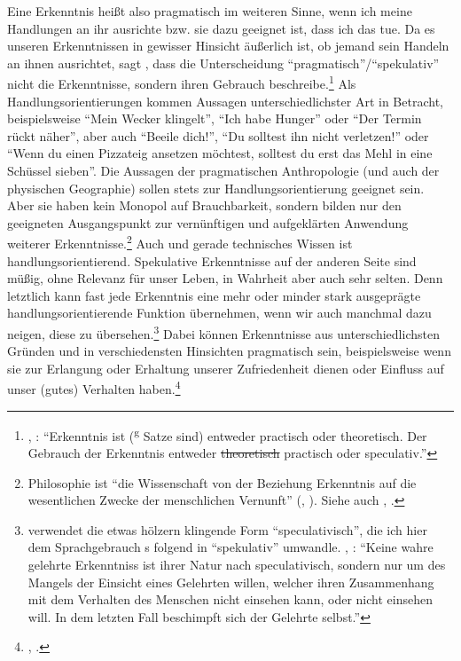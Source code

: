 Eine Erkenntnis heißt also pragmatisch im weiteren Sinne, wenn ich meine
Handlungen an ihr ausrichte bzw.
sie dazu geeignet ist, dass ich das tue. Da es unseren Erkenntnissen in gewisser
Hinsicht äußerlich ist, ob jemand sein Handeln an ihnen ausrichtet, sagt
, dass die Unterscheidung \enquote{pragmatisch}/\enquote{spekulativ}
nicht die Erkenntnisse, sondern ihren Gebrauch
beschreibe.\footnote{\cite[Vgl.][]{Kant:Reflexionen1900ff.},
\cite[][XVI:
519.15--17]{Kant:GesammelteWerke1900ff.}: \enquote{Erkenntnis ist
(\textsuperscript{g} Satze sind) entweder practisch oder theoretisch. Der
Gebrauch der Erkenntnis entweder \sout{theoretisch} practisch oder speculativ.}} Als Handlungsorientierungen
kommen Aussagen unterschiedlichster Art in Betracht, beispielsweise
\enquote{Mein Wecker klingelt}, \enquote{Ich habe Hunger} oder \enquote{Der
Termin rückt näher}, aber auch \enquote{Beeile dich!}, \enquote{Du solltest ihn
nicht verletzen!} oder \enquote{Wenn du einen Pizzateig ansetzen möchtest,
solltest du erst das Mehl in eine Schüssel sieben}. Die Aussagen der
pragmatischen Anthropologie (und auch der physischen Geographie) sollen stets
zur Handlungsorientierung geeignet sein. Aber sie haben kein Monopol auf
Brauchbarkeit, sondern bilden nur den geeigneten Ausgangspunkt zur vernünftigen
und aufgeklärten Anwendung weiterer Erkenntnisse.\footnote{Philosophie ist
\enquote{die Wissenschaft von der Beziehung  Erkenntnis auf die
wesentlichen Zwecke der menschlichen Vernunft}
\mkbibparens{\cite[][B 867]{Kant:KritikderreinenVernunft2003},
\cite[][III: 542.26--28]{Kant:GesammelteWerke1900ff.}}. Siehe auch
\cite[][A 23]{Kant:ImmanuelKantsLogik1977}, \cite[][IX:
23.30--24.2]{Kant:GesammelteWerke1900ff.}.} Auch und gerade technisches Wissen
ist handlungsorientierend.
Spekulative Erkenntnisse auf der anderen Seite sind müßig, ohne Relevanz für
unser Leben, in Wahrheit aber auch sehr selten. Denn letztlich kann fast jede
Erkenntnis eine mehr oder minder stark ausgeprägte
handlungsorientierende Funktion übernehmen, wenn wir auch manchmal
dazu neigen, diese zu übersehen.\footnote{ verwendet die etwas
hölzern klingende Form \enquote{speculativisch}, die ich hier dem
Sprachgebrauch s folgend in \enquote{spekulativ} umwandle.
\cite[Vgl.][\S~219]{Meier:AuszugausderVernunftlehre1752}, \cite[][XVI:
520.14--17]{Kant:GesammelteWerke1900ff.}: \enquote{Keine wahre gelehrte
Erkenntniss ist ihrer Natur nach speculativisch, sondern nur um des Mangels der
Einsicht eines Gelehrten willen, welcher ihren Zusammenhang mit dem Verhalten
des Menschen nicht einsehen kann, oder nicht einsehen will. In dem letzten Fall
beschimpft sich der Gelehrte selbst.}} Dabei können Erkenntnisse aus
unterschiedlichsten Gründen und in verschiedensten Hinsichten pragmatisch sein,
beispielsweise wenn sie zur Erlangung oder Erhaltung
unserer Zufriedenheit dienen oder Einfluss auf unser (gutes)
Verhalten
haben.\footnote{\cite[Vgl.][\S\S~222--225]{Meier:AuszugausderVernunftlehre1752},
\cite[XVI: 520--522]{Kant:GesammelteWerke1900ff.}.}

